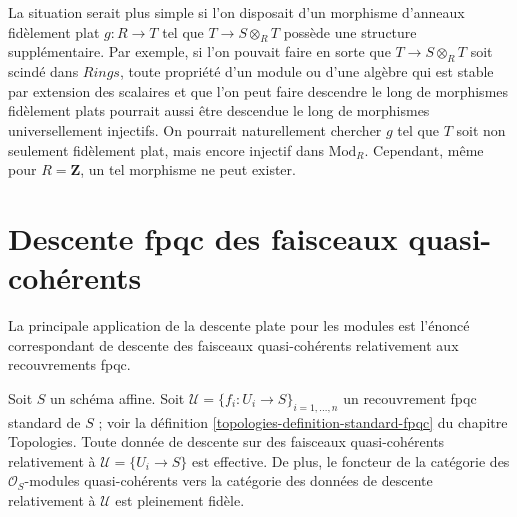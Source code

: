 \begin{remark}
\label{remark-when-locally-split}
La situation serait plus simple si l'on disposait d'un morphisme d'anneaux
fidèlement plat $g: R \to T$ tel que $T \to S \otimes_R T$
possède une structure supplémentaire.
Par exemple, si l'on pouvait faire en sorte que $T \to S \otimes_R T$
soit scindé dans $\textit{Rings}$, toute propriété d'un module ou d'une algèbre
qui est stable par extension des scalaires et que l'on peut faire descendre le
long de morphismes fidèlement plats pourrait aussi être descendue le long de
morphismes universellement injectifs.
On pourrait naturellement chercher $g$ tel que $T$ soit non seulement
fidèlement plat, mais encore injectif dans $\text{Mod}_R$.
Cependant, même pour $R = \mathbf{Z}$, un tel morphisme ne peut exister.
\end{remark}
















\section{Descente fpqc des faisceaux quasi-cohérents}
\label{section-fpqc-descent-quasi-coherent}

\noindent
La principale application de la descente plate pour les modules
est l'énoncé correspondant de descente des faisceaux quasi-cohérents
relativement aux recouvrements fpqc.

\begin{lemma}
\label{lemma-standard-fpqc-covering}
Soit $S$ un schéma affine.
Soit $\mathcal{U} = \{f_i : U_i \to S\}_{i = 1, \ldots, n}$
un recouvrement fpqc standard de $S$ ; voir la définition
\ref{topologies-definition-standard-fpqc} du chapitre Topologies.
Toute donnée de descente sur des faisceaux quasi-cohérents
relativement à $\mathcal{U} = \{U_i \to S\}$ est effective.
De plus, le foncteur de la catégorie des $\mathcal{O}_S$-modules
quasi-cohérents vers la catégorie des données de descente
relativement à $\mathcal{U}$ est pleinement fidèle.
\end{lemma}

